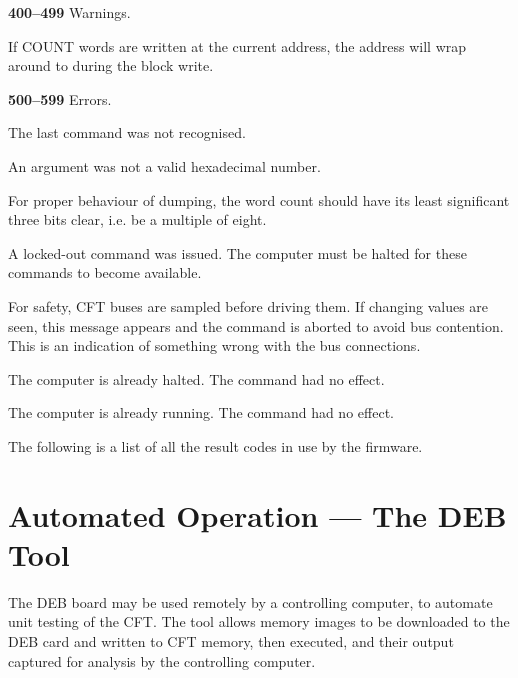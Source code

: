 \begin{description}
\item{\bfseries 400–499} Warnings.
  \begin{description}
  \item{\bfseries{}} If COUNT
    words are written at the current address, the address will wrap
    around to  during the block write.
  \end{description}
  
\item{\bfseries 500–599} Errors.
  \begin{description}
  \item{\bfseries{}} The last command was not recognised.
  \item{\bfseries{}} An argument was not a valid hexadecimal number.
  \item{\bfseries{}} For proper
    behaviour of dumping, the word count should have its least
    significant three bits clear, i.e. be a multiple of eight.
  \item{\bfseries{}} A locked-out command was
    issued. The computer must be halted for these commands to become
    available.
  \item{\bfseries{}} For safety, CFT buses are sampled
    before driving them. If changing values are seen, this message
    appears and the command is aborted to avoid bus contention. This
    is an indication of something wrong with the bus connections.
  \item{\bfseries{}} The computer is already
    halted. The  command had no effect.
  \item{\bfseries{}} The computer is already
    running. The  command had no effect.
  \end{description}
\end{description}

The following is a list of all the result codes in use by the firmware.

\section{Automated Operation — The DEB Tool}

The \gls{DEB} board may be used remotely by a controlling computer, to
automate unit testing of the CFT. The tool allows memory images to be
downloaded to the DEB card and written to CFT memory, then executed,
and their output captured for analysis by the controlling computer.

